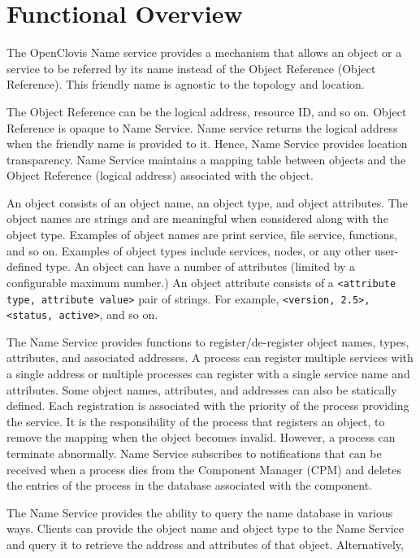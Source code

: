 \hypertarget{group__group28}{
\chapter{Functional Overview}
\label{group__group28}
}

\begin{flushleft}
The OpenClovis Name service provides a mechanism that allows an object or a service to be referred by its name instead of the Object Reference 
(Object Reference). This friendly name is agnostic to the topology and location. 
\par
The Object Reference can be the logical address, resource ID, and so on. Object Reference is opaque to Name Service. Name service returns the 
logical address when the friendly name is provided to it. Hence, Name Service provides location transparency.
Name Service maintains a mapping table between objects and the Object Reference (logical address) associated with the object. 
\par
An object consists of an object name, an object type, and object attributes. The object names are strings and are meaningful when considered along with
the object type. Examples of object names are print service, file service, functions, and so on. Examples of object types include services, nodes, or 
any other user-defined type. An object can have a number of attributes (limited by a configurable maximum number.) An object attribute consists of a 
{\tt{<attribute type, attribute value>}} pair of strings. For example, {\tt{<version, 2.5>, <status, active>}}, and so on. 
\par
The Name Service provides functions to register/de-register object names, types, attributes, and associated addresses. A process can register multiple 
services with a single address or multiple processes can register with a single service name and attributes. Some object names, attributes, and addresses 
can also be statically defined. Each registration is associated with the priority of the process providing the service. It is the responsibility of the 
process that registers an object, to remove the mapping when the object becomes invalid. However, a process can terminate abnormally. Name Service 
subscribes to notifications that can be received when a process dies from the Component Manager (CPM) and deletes the entries of the process in the database 
associated with the component. 
\par
The Name Service provides the ability to query the name database in various ways. 
Clients can provide the object name and object type to the Name Service and query it to retrieve the address and attributes of that object. Alternatively, 

\end{flushleft}
